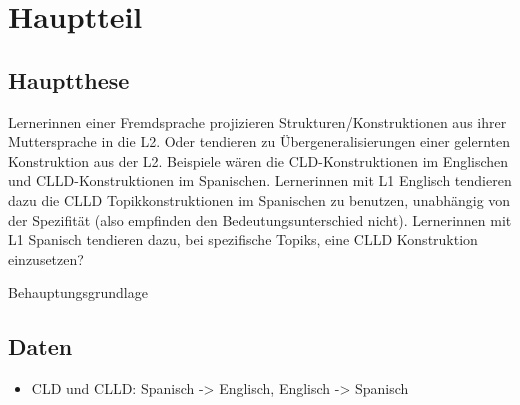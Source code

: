 \section{Hauptteil}

\subsection{Hauptthese}

Lernerinnen einer Fremdsprache projizieren Strukturen/Konstruktionen aus ihrer Muttersprache in die L2.
Oder tendieren zu Übergeneralisierungen einer gelernten Konstruktion aus der L2.
Beispiele wären die CLD-Konstruktionen im Englischen und CLLD-Konstruktionen im Spanischen.
Lernerinnen mit L1 Englisch tendieren dazu die CLLD Topikkonstruktionen im Spanischen zu benutzen, unabhängig von der Spezifität (also empfinden den Bedeutungsunterschied nicht).
Lernerinnen mit L1 Spanisch tendieren dazu, bei spezifische Topiks, eine CLLD Konstruktion einzusetzen?
\cite{Valenzuela05}


Behauptungsgrundlage


\subsection{Daten}
\begin{itemize}
    \item \cite{Valenzuela05} CLD und CLLD: Spanisch -> Englisch, Englisch -> Spanisch
%
%
\end{itemize}

